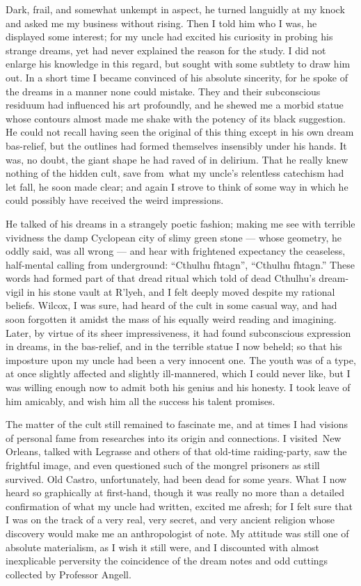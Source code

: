 Dark, frail, and somewhat unkempt in aspect, he turned languidly at my
knock and asked me my business without rising. Then I told him who I
was, he displayed some interest; for my uncle had excited his curiosity
in probing his strange dreams, yet had never explained the reason for
the study. I did not enlarge his knowledge in this regard, but sought
with some subtlety to draw him out. In a short time I became convinced
of his absolute sincerity, for he spoke of the dreams in a manner none
could mistake. They and their subconscious residuum had influenced his
art profoundly, and he shewed me a morbid statue whose contours almost
made me shake with the potency of its black suggestion. He could not
recall having seen the original of this thing except in his own dream
bas-relief, but the outlines had formed themselves insensibly under his
hands. It was, no doubt, the giant shape he had raved of in delirium.
That he really knew nothing of the hidden cult, save from\est\ what my
uncle's relentless catechism had let fall, he soon made clear; and again
I strove to think of some way in which he could possibly have received
the weird impressions.

He talked of his dreams in a strangely poetic fashion; making me see
with terrible vividness the damp Cyclopean city of slimy green stone ---
whose geometry, he oddly said, was all wrong --- and hear with frightened
expectancy the ceaseless, half-mental calling from underground:
``Cthulhu fhtagn'', ``Cthulhu fhtagn.''
These words had formed part of that dread ritual which told of dead
Cthulhu's dream-vigil in his stone vault at R'lyeh, and I felt deeply
moved despite my rational beliefs. Wilcox, I was sure, had heard of the
cult in some casual way, and had soon forgotten it amidst the mass of
his equally weird reading and imagining. Later, by virtue of its sheer
impressiveness, it had found subconscious expression in dreams, in the
bas-relief, and in the terrible statue I now beheld; so that his
imposture upon my uncle had been a very innocent one. The youth was of a
type, at once slightly affected and slightly ill-mannered, which I could
never like, but I was willing enough now to admit both his genius and
his honesty. I took leave of him amicably, and wish him all the success
his talent promises.


The matter of the cult still remained to fascinate me, and at times I
had visions of personal fame from researches into its origin and
connections. I visited\est\ New Orleans, talked with Legrasse and others of
that old-time raiding-party, saw the frightful image, and even
questioned such of the mongrel prisoners as still survived. Old Castro,
unfortunately, had been dead for some years. What I now heard so
graphically at first-hand, though it was really no more than a detailed
confirmation of what my uncle had written, excited me afresh; for I felt
sure that I was on the track of a very real, very secret, and very
ancient religion whose discovery would make me an anthropologist of
note. My attitude was still one of absolute materialism, as I wish it
still were, and I discounted with almost inexplicable perversity the
coincidence of the dream notes and odd cuttings collected by Professor
Angell.


